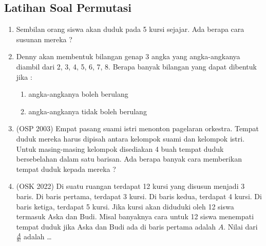 \subsection{Latihan Soal Permutasi}
\begin{enumerate} 
    \item Sembilan orang siswa akan duduk pada 5 kursi sejajar. Ada berapa cara susunan mereka ? 
    
    \item Denny akan membentuk bilangan genap 3 angka yang angka-angkanya diambil dari 2, 3, 4, 5, 6, 7, 8. Berapa banyak bilangan yang dapat dibentuk jika : 
    \begin{enumerate}
        \item angka-angkanya boleh berulang 
        \item angka-angkanya tidak boleh berulang
    \end{enumerate}
    
    \item (OSP 2003) Empat pasang suami istri menonton pagelaran orkestra. Tempat duduk mereka harus dipisah antara kelompok suami dan kelompok istri. Untuk masing-masing kelompok disediakan 4 buah tempat duduk bersebelahan dalam satu barisan. Ada berapa banyak cara memberikan tempat duduk kepada mereka ?

    \item (OSK 2022) Di suatu ruangan terdapat 12 kursi yang disusun menjadi 3 baris. Di baris pertama, terdapat 3 kursi. Di baris kedua, terdapat 4 kursi. Di baris ketiga, terdapat 5 kursi. Jika kursi akan diduduki oleh 12 siswa termasuk Aska dan Budi. Misal banyaknya cara untuk 12 siswa menempati tempat duduk jika Aska dan Budi ada di baris pertama adalah $A$. Nilai dari $\frac{A}{8!}$ adalah \ldots

\end{enumerate}